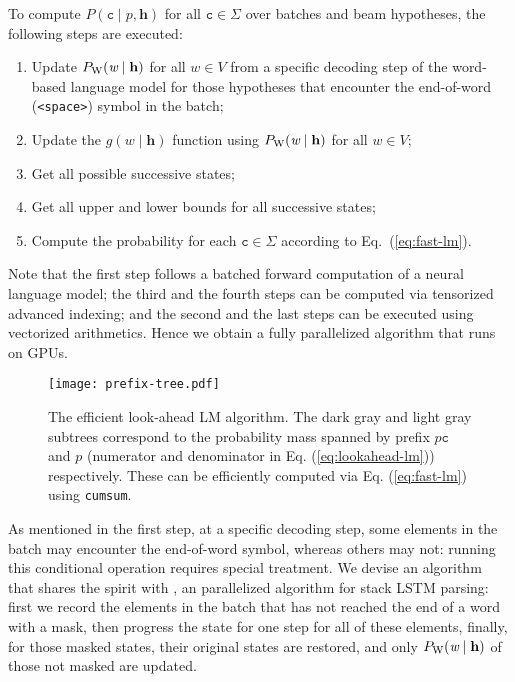 \documentclass{article}
\def\prefix{\textit{p}}
\def\word{{\textit{w}}}
\def\ch{\mathtt{c}}
\def\history{\mathbf{h}}
\begin{document}
To compute $P(\ch \mid \prefix, \history)$ for all $\ch \in \Sigma$ over batches and beam hypotheses, the following steps are executed:
\begin{enumerate}[label=(\roman*)]
    \item Update $P_{\rm W}(\word \mid \history)$ for all $\word \in V$ from a specific decoding step of the word-based language model for those hypotheses that encounter the end-of-word (\texttt{<space>}) symbol in the batch;
    \item Update the $g(\word \mid \history)$ function using $P_{\rm W}(\word \mid \history)$ for all $\word \in V$;
    \item Get all possible successive states;
    \item Get all upper and lower bounds for all successive states;
    \item Compute the probability for each $\ch \in \Sigma$ according to Eq.~(\ref{eq:fast-lm}).
\end{enumerate}
Note that the first step follows a batched forward computation of a neural language model; the third and the fourth steps can be computed via tensorized advanced indexing; and the second and the last steps can be executed using vectorized arithmetics. Hence we obtain a fully parallelized algorithm that runs on GPUs.
\begin{figure}[t]
    \centering
    \texttt{[image: prefix-tree.pdf]}
    \caption{The efficient look-ahead LM algorithm. The dark gray and light gray subtrees correspond to the probability mass spanned by prefix $p\ch$ and $p$ (numerator and denominator in Eq. (\ref{eq:lookahead-lm})) respectively. These can be efficiently computed via Eq. (\ref{eq:fast-lm}) using \texttt{cumsum}.}
    \label{fig:prefix-tree}
\end{figure}

As mentioned in the first step, at a specific decoding step, some elements in the batch may encounter the end-of-word symbol, whereas others may not: running this conditional operation requires special treatment. We devise an algorithm that shares the spirit with \cite{ding-koehn-2019-parallelizable}, an parallelized algorithm for stack LSTM parsing: first we record the elements in the batch that has not reached the end of a word with a mask, then progress the state for one step for all of these elements, finally, for those masked states, their original states are restored, and only $P_{\rm W}(\word \mid \history)$ of those not masked are updated.
\end{document}
